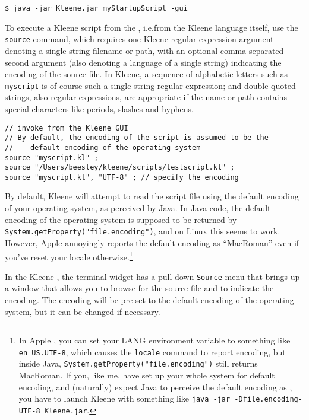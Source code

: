 \begin{Verbatim}
$ java -jar Kleene.jar myStartupScript -gui
\end{Verbatim}

To execute a Kleene script from the , i.e.\@ from the Kleene
language itself, use the \texttt{source} command, which requires one
Kleene-regular-expression argument denoting a single-string filename or path,
with an optional comma-separated second argument (also denoting a language of
a single string) indicating the encoding of the source file.  In Kleene, a
sequence of alphabetic letters such as \texttt{myscript} is of course such a
single-string regular expression; and double-quoted strings, also regular
expressions, are appropriate if the name or path contains special characters
like periods, slashes and hyphens.

\begin{Verbatim}
// invoke from the Kleene GUI
// By default, the encoding of the script is assumed to be the 
//    default encoding of the operating system
source "myscript.kl" ;
source "/Users/beesley/kleene/scripts/testscript.kl" ;
source "myscript.kl", "UTF-8" ; // specify the encoding
\end{Verbatim}

By default, Kleene will attempt to read the script file using the default
encoding of your operating system, as perceived by Java. In Java code,
the default encoding of the operating system is supposed to be returned by
\texttt{System.getProperty("file.encoding")}, and on Linux this seems to work.
However, Apple  annoyingly reports the default encoding as ``MacRoman'' even if you've reset your locale
otherwise.\footnote{In Apple , you can set your LANG
environment variable to something like \verb!en_US.UTF-8!, which causes
the \verb!locale! command to report  encoding, but inside
Java, \texttt{System.getProperty("file.encoding")} still returns
MacRoman.  If you, like me, have set up your whole  system for default
 encoding, and (naturally) expect Java to perceive the default encoding
as ,
you have to launch Kleene with something like \texttt{java -jar -Dfile.encoding-UTF-8
Kleene.jar}.}

In the Kleene , the terminal widget has a pull-down \verb!Source!
menu that brings up a window that allows you to browse for the source file and
to indicate the encoding.  The encoding will be pre-set to the default encoding
of the operating system, but it can be changed if necessary.

